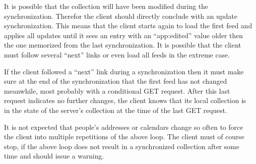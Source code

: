 \documentclass[11pt,a4paper,headsepline,twoside]{scrartcl}		%
\begin{document}
It is possible that the collection will have been modified during the
synchronization. Therefor the client should directly conclude with an update
synchronization. This means that the client starts again to load the first feed
and applies all updates until it sees an entry with an ``app:edited'' value
older then the one memorized from the last synchronization. It is possible that
the client must follow several ``next'' links or even load all feeds in the
extreme case.

If the client followed a ``next'' link during a synchronization then it must
make sure at the end of the synchronization that the first feed has not changed
meanwhile, most probably with a conditional GET request. After this last request
indicates no further changes, the client knows that its local collection is in
the state of the server's collection at the time of the last GET request. 

It is not expected that people's addresses or calendars change so often to force
the client into multiple repetitions of the above loop. The client must of
course stop, if the above loop does not result in a synchronized collection
after some time and should issue a warning.







\end{document}
